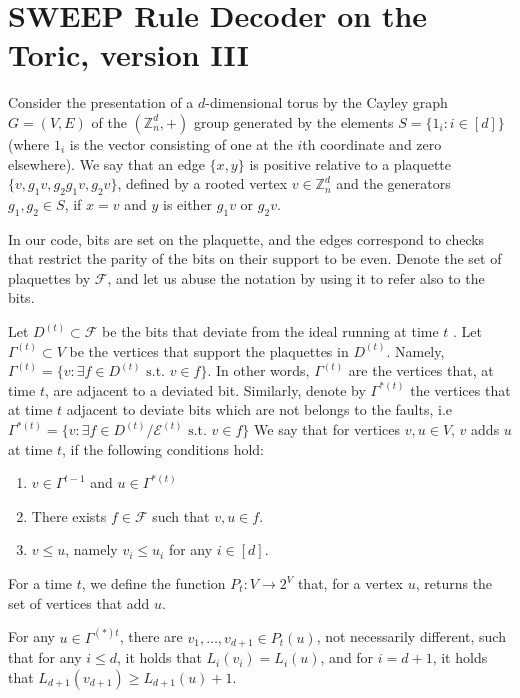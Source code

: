 
\section{SWEEP Rule Decoder on the Toric, version III}
Consider the presentation of a $d$-dimensional torus by the Cayley graph $G = (V,E)$ of the $\left( \mathbb{Z}_{n}^{d}, + \right)$ group generated by the elements $S = \{ 1_{i} \colon i \in [d] \}$ (where $1_{i}$ is the vector consisting of one at the $i$th coordinate and zero elsewhere). We say that an edge $\{x, y\}$ is positive relative to a plaquette $\{v, g_{1}v, g_{2}g_{1}v, g_{2}v\}$, defined by a rooted vertex $v \in \mathbb{Z}_{n}^{d}$ and the generators $g_{1}, g_{2} \in S$, if $x = v$ and $y$ is either $g_{1}v$ or $g_{2}v$. 

In our code, bits are set on the plaquette, and the edges correspond to checks that restrict the parity of the bits on their support to be even. Denote the set of plaquettes by $\mathcal{F}$, and let us abuse the notation by using it to refer also to the bits.


\begin{definition}
  Let $D^{(t)} \subset \mathcal{F}$ be the bits that deviate from the ideal running at time $t$ . Let $\Gamma^{(t)} \subset V$ be the vertices that support the plaquettes in $D^{(t)}$. Namely, $\Gamma^{(t)} = \{ v \colon \exists f \in D^{(t)} \text{ s.t. } v \in f\}$. In other words, $\Gamma^{(t)}$ are the vertices that, at time $t$, are adjacent to a deviated bit. Similarly, denote by $\Gamma^{* (t)}$ the vertices that at time $t$ adjacent to deviate bits which are not belongs to the faults, i.e $\Gamma^{*(t)} = \{ v : \exists f \in D^{(t)} / \mathcal{E}^{(t)}\text{ s.t. } v \in f\}$
We say that for vertices $v, u \in V$, $v$ adds $u$ at time $t$, if the following conditions hold:
\begin{enumerate}
  \item $v \in \Gamma^{t-1}$  and $ u \in \Gamma^{* (t)}$
  \item There exists $f \in \mathcal{F}$ such that  $v, u \in f$.  
  \item $v \le u $, namely $v_{i} \le u_{i}$ for any $i\in [d]$.
\end{enumerate}
For a time $t$, we define the function $P_{t} \colon  V \rightarrow 2^{V}$ that, for a vertex $u$, returns the set of vertices that add $u$.
\end{definition}

\begin{claim}
  For any $u \in \Gamma^{(*) t}$, there are $v_{1}, \ldots, v_{d+1} \in P_{t}(u)$, not necessarily different, such that for any $i \le d$, it holds that $L_{i}(v_{i}) = L_{i}(u)$, and for $i = d+1$, it holds that $L_{d+1}(v_{d+1}) \ge L_{d+1}(u) + 1$.
\end{claim}

